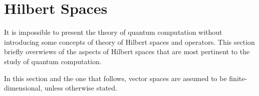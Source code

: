 \section{Hilbert Spaces} \label{sec:linalg}



It is impossible to present the theory of quantum computation without introducing some concepts of theory of Hilbert spaces and operators. This section briefly overwiews of the aspects of Hilbert spaces that are most pertinent to the study of quantum computation. 

\begin{convention}
  In this section and the one that follows, vector spaces are assumed to be finite-dimensional, unless otherwise stated.
\end{convention}






